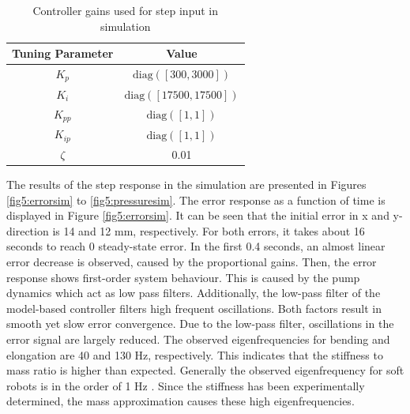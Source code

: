 \begin{table}[H]
    \centering
     \caption{Controller gains used for step input in simulation}
    \begin{tabular}{|c|c|} \hline
     \textbf{Tuning Parameter}    & \textbf{Value}  \\ \hline
    $K_p$ & $\text{diag}([300,3000])$  \\ \hline
    $K_i$ & $\text{diag}([17500,17500])$  \\ \hline
    $K_{pp}$ & $\text{diag}([1,1])$  \\ \hline
    $K_{ip}$ & $\text{diag}([1,1])$ \\ \hline
    $\zeta$ & 0.01 \\ \hline
    \end{tabular}

    \label{tab5:gainssim}
\end{table}

The results of the step response in the simulation are presented in Figures \ref{fig5:errorsim} to \ref{fig5:pressuresim}. The error response as a function of time is displayed in Figure \ref{fig5:errorsim}. It can be seen that the initial error in x and y-direction is 14 and 12 mm, respectively. For both errors, it takes about 16 seconds to reach 0 steady-state error. In the first 0.4 seconds, an almost linear error decrease is observed, caused by the proportional gains. Then, the error response shows first-order system behaviour. This is caused by the pump dynamics which act as low pass filters. Additionally, the low-pass filter of the model-based controller filters high frequent oscillations. Both factors result in smooth yet slow error convergence. Due to the low-pass filter, oscillations in the error signal are largely reduced. The observed eigenfrequencies for bending and elongation are 40 and 130 Hz, respectively. This indicates that the stiffness to mass ratio is higher than expected. Generally the observed eigenfrequency for soft robots is in the order of 1 Hz \cite{tawk2018bioinspired}. Since the stiffness has been experimentally determined, the mass approximation causes these high eigenfrequencies.




